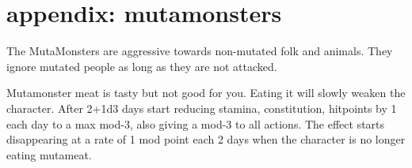 
































\clearpage
\raggedbottom
\section*{appendix: mutamonsters}
\label{appendixmutamonsters}

The MutaMonsters are aggressive towards non-mutated folk and animals. They ignore mutated people as long as they are not attacked.

Mutamonster meat is tasty but not good for you. Eating it will slowly weaken the character. After 2+1d3 days start reducing stamina, constitution, hitpoints by 1 each day to a max mod-3, also giving a mod-3 to all actions. The effect starts disappearing at a rate of 1 mod point each 2 days when the character is no longer eating mutameat.

